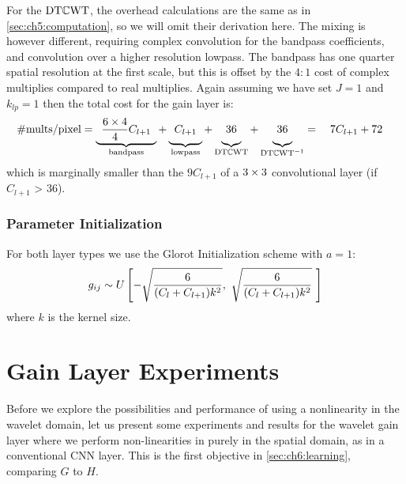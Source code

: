For the $\mathrm{DT}\mathbb{C}\mathrm{WT}$, the overhead calculations are the same as in
\autoref{sec:ch5:computation}, so we will omit their derivation here. The mixing
is however different, requiring complex convolution for the bandpass
coefficients, and convolution over a higher resolution lowpass. The bandpass has
one quarter spatial resolution at the first scale, but this is offset by the
$4:1$ cost of complex multiplies compared to real multiplies. Again assuming we
have set $J=1$ and $k_{lp} = 1$ then the total cost for the gain layer is:
%
\begin{equation}
  \text{\#mults/pixel} = \underbrace{\hphantom{1} \frac{6\x 4}{4}C_{l+1} \hphantom{1}}_{\textrm{bandpass}} +
  \underbrace{\hphantom{1}\vphantom{\frac{6}{4}} C_{l+1} \hphantom{1}}_{\textrm{lowpass}} + 
  \underbrace{\vphantom{\frac{6}{4}} 36}_{\DTCWT} + 
  \underbrace{\vphantom{\frac{6}{4}} 36}_{\DTCWT^{-1}} = \quad 7C_{l+1} + 72 \quad
  \label{eq:ch6:comp_dtcwt}
\end{equation}
which is marginally smaller than the $9C_{l+1}$ of a $3\times 3$ convolutional layer (if $C_{l+1}$ > 36).

\subsubsection{Parameter Initialization}
For both layer types we use the Glorot Initialization scheme \cite{glorot_understanding_2010}
with $a=1$: 
%
\begin{equation}
  g_{ij} \sim U\left[ -\sqrt{\frac{6}{(C_l + C_{l+1})k^2}},\ \sqrt{\frac{6}{(C_l + C_{l+1})k^2}}\
  \right] \label{eq:ch6:glorot}
\end{equation}
where $k$ is the kernel size.

\section{Gain Layer Experiments}\label{sec:ch6:gainlayer_experiments}
Before we explore the possibilities and performance of using a
nonlinearity in the wavelet domain, let us present some experiments and results
for the wavelet gain layer where we perform non-linearities in purely in the
spatial domain, as in a conventional CNN layer. This is the first objective in
\autoref{sec:ch6:learning}, comparing $G$ to $H$.


